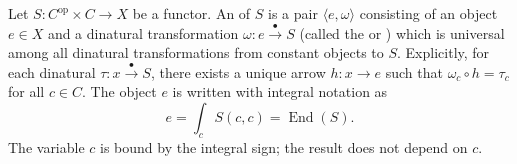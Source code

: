 Let $S : C^{\mathrm{op}} \times C \to X$ be a functor. An  of $S$ is a pair $\langle e, \omega \rangle$ consisting of an object $e \in X$ and a dinatural transformation $\omega : e \xrightarrow{\bullet} S$ (called the  or ) which is universal among all dinatural transformations from constant objects to $S$. Explicitly, for each dinatural $\tau : x \xrightarrow{\bullet} S$, there exists a unique arrow $h : x \to e$ such that $\omega_c \circ h = \tau_c$ for all $c \in C$. The object $e$ is written with integral notation as
$$
e = \int_c S(c, c) = \operatorname{End}(S).
$$
The variable $c$ is bound by the integral sign; the result does not depend on $c$.
